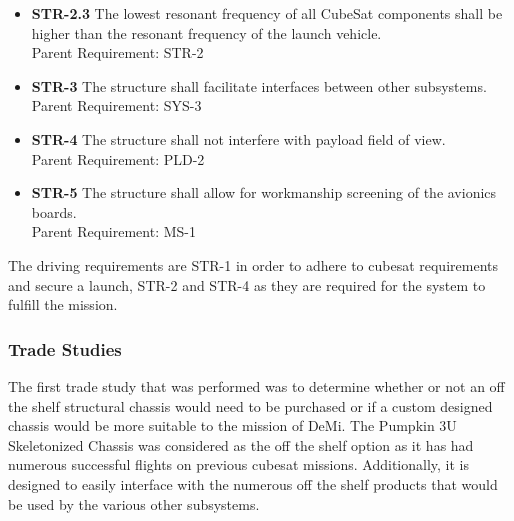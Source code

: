 \documentclass[12pt]{article}
\begin{document}
\begin{itemize}
\item \textbf{STR-2.3} The lowest resonant frequency of all CubeSat components shall be higher than the resonant frequency of the launch vehicle.\\
Parent Requirement: STR-2

\item \textbf{STR-3} The structure shall facilitate interfaces between other subsystems.\\
Parent Requirement: SYS-3

\item \textbf{STR-4} The structure shall not interfere with payload field of view.\\
Parent Requirement: PLD-2

\item \textbf{STR-5} The structure shall allow for workmanship screening of the avionics boards.\\
Parent Requirement: MS-1

\end{itemize}

The driving requirements are STR-1 in order to adhere to cubesat requirements and secure a launch, STR-2 and STR-4 as they are required for the system to fulfill the mission.

\subsubsection{Trade Studies}
The first trade study that was performed was to determine whether or not an off the shelf structural chassis would need to be purchased or if a custom designed chassis would be more suitable to the mission of DeMi. The Pumpkin 3U Skeletonized Chassis was considered as the off the shelf option as it has had numerous successful flights on previous cubesat missions. Additionally, it is designed to easily interface with the numerous off the shelf products that would be used by the various other subsystems.
\end{document}
